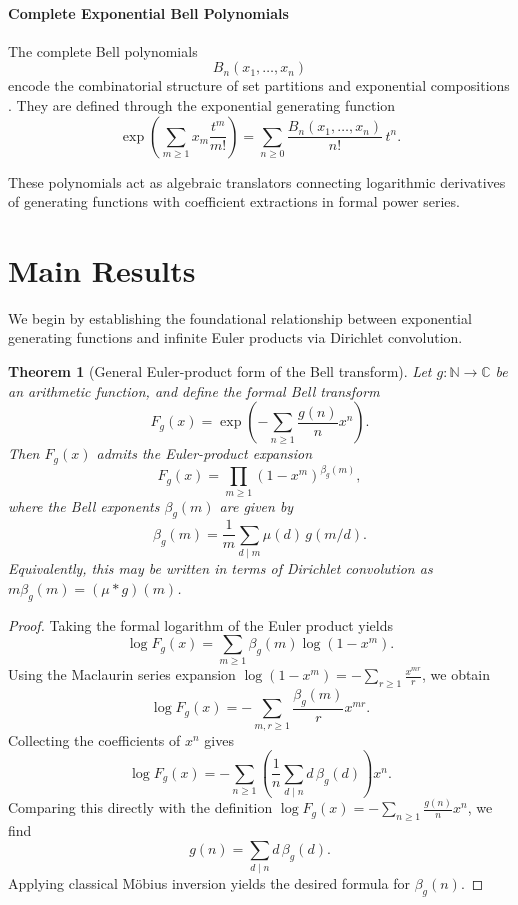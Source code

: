 \documentclass[11pt, a4paper]{article}
\newtheorem{theorem}{Theorem}[section]
\theoremstyle{remark}
\begin{document}
\paragraph{Complete Exponential Bell Polynomials}
The complete Bell polynomials
\[
B_n(x_1,\dots,x_n)
\]
encode the combinatorial structure of set partitions and exponential compositions \cite{Comtet1974}. They are defined through the exponential generating function
\[
\exp\!\left(
\sum_{m\ge1}x_m\frac{t^m}{m!}
\right)
=
\sum_{n\ge0}
\frac{
B_n(x_1,\dots,x_n)
}{n!}\,
t^n.
\]

These polynomials act as algebraic translators connecting logarithmic derivatives of generating functions with coefficient extractions in formal power series.
\section{Main Results}

We begin by establishing the foundational relationship between exponential generating functions and infinite Euler products via Dirichlet convolution.

\begin{theorem}[General Euler-product form of the Bell transform] \label{thm:euler_product}
Let \(g:\mathbb N\to\mathbb C\) be an arithmetic function, and define the formal Bell transform
\[
F_g(x)
=
\exp\!\left(
-\sum_{n\ge1}\frac{g(n)}{n}x^n
\right).
\]
Then \(F_g(x)\) admits the Euler-product expansion
\[
F_g(x)
=
\prod_{m\ge1}(1-x^m)^{\beta_g(m)},
\]
where the Bell exponents \(\beta_g(m)\) are given by
\[
\beta_g(m)
=
\frac1m
\sum_{d\mid m}\mu(d)\,g(m/d).
\]
Equivalently, this may be written in terms of Dirichlet convolution as \( m\beta_g(m) = (\mu*g)(m) \).
\end{theorem}

\begin{proof}
Taking the formal logarithm of the Euler product yields
\[
\log F_g(x)
=
\sum_{m\ge1}\beta_g(m)\log(1-x^m).
\]
Using the Maclaurin series expansion \(\log(1-x^m) = -\sum_{r\ge1}\frac{x^{mr}}{r}\), we obtain
\[
\log F_g(x)
=
-\sum_{m,r\ge1}\frac{\beta_g(m)}r x^{mr}.
\]
Collecting the coefficients of \(x^n\) gives
\[
\log F_g(x)
=
-\sum_{n\ge1}
\left(
\frac1n
\sum_{d\mid n} d\,\beta_g(d)
\right)x^n.
\]
Comparing this directly with the definition \(\log F_g(x) = -\sum_{n\ge1}\frac{g(n)}n x^n\), we find
\[
g(n)=\sum_{d\mid n}d\,\beta_g(d).
\]
Applying classical Möbius inversion yields the desired formula for \(\beta_g(n)\).
\end{proof}
\end{document}
